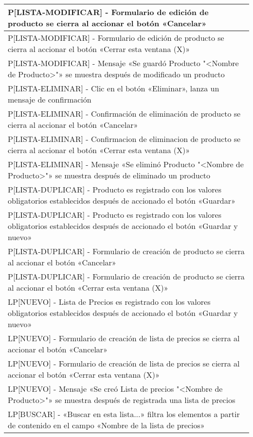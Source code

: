 \begin{longtable}{|p{15.0cm}|}
P[LISTA-MODIFICAR] - Formulario de edición de producto se cierra al accionar el botón «Cancelar» \\ \hline
P[LISTA-MODIFICAR] - Formulario de edición de producto se cierra al accionar el botón «Cerrar esta ventana (X)» \\ \hline
P[LISTA-MODIFICAR] - Mensaje «Se guardó Producto "<Nombre de Producto>"» se muestra después de modificado un producto \\ \hline
P[LISTA-ELIMINAR] - Clic en el botón «Eliminar», lanza un mensaje de confirmación \\ \hline
P[LISTA-ELIMINAR] - Confirmación de eliminación de producto se cierra al accionar el botón «Cancelar» \\ \hline
P[LISTA-ELIMINAR] - Confirmacion de eliminacion de producto se cierra al accionar el botón «Cerrar esta ventana (X)» \\ \hline
P[LISTA-ELIMINAR] - Mensaje «Se eliminó Producto "<Nombre de Producto>"» se muestra después de eliminado un producto \\ \hline
P[LISTA-DUPLICAR] - Producto es registrado con los valores obligatorios establecidos después de accionado el botón «Guardar» \\ \hline
P[LISTA-DUPLICAR] - Producto es registrado con los valores obligatorios establecidos después de accionado el botón «Guardar y nuevo» \\ \hline
P[LISTA-DUPLICAR] - Formulario de creación de producto se cierra al accionar el botón «Cancelar» \\ \hline
P[LISTA-DUPLICAR] - Formulario de creación de producto se cierra al accionar el botón «Cerrar esta ventana (X)» \\ \hline
LP[NUEVO] - Lista de Precios es registrado con los valores obligatorios establecidos después de accionado el botón «Guardar y nuevo» \\ \hline
LP[NUEVO] - Formulario de creación de lista de precios se cierra al accionar el botón «Cancelar» \\ \hline
LP[NUEVO] - Formulario de creación de lista de precios se cierra al accionar el botón «Cerrar esta ventana (X)» \\ \hline
LP[NUEVO] - Mensaje «Se creó Lista de precios "<Nombre de Producto>"» se muestra después de registrada una lista de precios \\ \hline
LP[BUSCAR] - «Buscar en esta lista...» filtra los elementos a partir de contenido en el campo «Nombre de la lista de precios» \\ \hline

\end{longtable}
